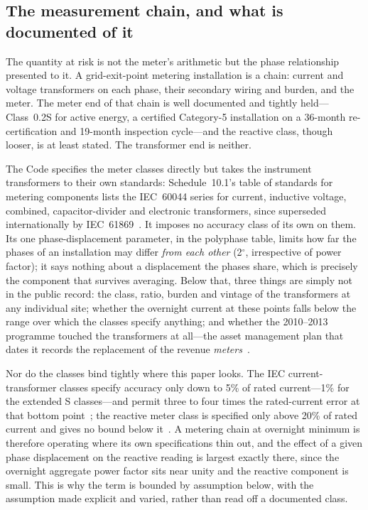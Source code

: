 \documentclass[journal]{IEEEtran}
\begin{document}
\subsection{The measurement chain, and what is documented of it}
The quantity at risk is not the meter's arithmetic but the phase relationship
presented to it. A grid-exit-point metering installation is a chain: current
and voltage transformers on each phase, their secondary wiring and burden, and
the meter. The meter end of that chain is well documented and tightly held---
Class~0.2S for active energy, a certified Category-5 installation on a
36-month re-certification and 19-month inspection cycle---and the reactive
class, though looser, is at least stated. The transformer end is neither.

The Code specifies the meter classes directly but takes the instrument
transformers to their own standards: Schedule~10.1's table of standards for
metering components lists the IEC~60044 series for current, inductive voltage,
combined, capacitor-divider and electronic transformers, since superseded
internationally by IEC~61869~\cite{eipc_part10}. It imposes no accuracy class
of its own on them. Its one phase-displacement parameter, in the polyphase
table, limits how far the phases of an installation may differ \emph{from each
other} (2$^\circ$, irrespective of power factor); it says nothing about a
displacement the phases share, which is precisely the component that survives
averaging. Below that, three things are simply not in the public record:
the class, ratio, burden and vintage of the transformers at any individual
site; whether the overnight current at these points falls below the range over
which the classes specify anything; and whether the 2010--2013 programme
touched the transformers at all---the asset management plan that dates it
records the replacement of the revenue \emph{meters}~\cite{transpower_amp}.

Nor do the classes bind tightly where this paper looks. The IEC current-transformer
classes specify accuracy only down to 5\% of rated current---1\% for the
extended S classes---and permit three to four times the rated-current error at
that bottom point~\cite{ccs_an136}; the reactive meter class is specified only
above 20\% of rated current and gives no bound below it~\cite{eipc_part10}. A
metering chain at overnight minimum is therefore operating where its own
specifications thin out, and the effect of a given phase displacement on the
reactive reading is largest exactly there, since the overnight aggregate power
factor sits near unity and the reactive component is small. This is why the
term is bounded by assumption below, with the assumption made explicit and
varied, rather than read off a documented class.
\end{document}
